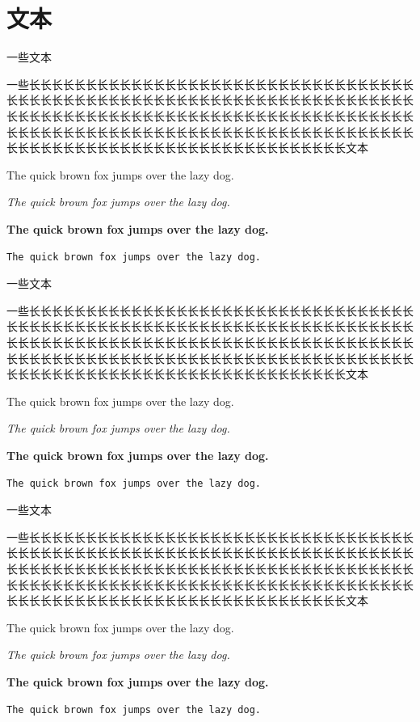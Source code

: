 \section{文本}

一些文本

一些长长长长长长长长长长长长长长长长长长长长长长长长长长长长长长长长长长长长长长长长长长长长长长长长长长长长长长长长长长长长长长长长长长长长长长长长长长长长长长长长长长长长长长长长长长长长长长长长长长长长长长长长长长长长长长长长长长长长长长长长长长长长长长长长长长长长长长长长长长长长长长长长长长长长长长长长长长长长长长长长长长长长长长长长长长长长文本

The quick brown fox jumps over the lazy dog.

\textit{The quick brown fox jumps over the lazy dog.}

\textbf{The quick brown fox jumps over the lazy dog.}

\texttt{The quick brown fox jumps over the lazy dog.}

一些文本

一些长长长长长长长长长长长长长长长长长长长长长长长长长长长长长长长长长长长长长长长长长长长长长长长长长长长长长长长长长长长长长长长长长长长长长长长长长长长长长长长长长长长长长长长长长长长长长长长长长长长长长长长长长长长长长长长长长长长长长长长长长长长长长长长长长长长长长长长长长长长长长长长长长长长长长长长长长长长长长长长长长长长长长长长长长长长长文本

The quick brown fox jumps over the lazy dog.

\textit{The quick brown fox jumps over the lazy dog.}

\textbf{The quick brown fox jumps over the lazy dog.}

\texttt{The quick brown fox jumps over the lazy dog.}

一些文本

一些长长长长长长长长长长长长长长长长长长长长长长长长长长长长长长长长长长长长长长长长长长长长长长长长长长长长长长长长长长长长长长长长长长长长长长长长长长长长长长长长长长长长长长长长长长长长长长长长长长长长长长长长长长长长长长长长长长长长长长长长长长长长长长长长长长长长长长长长长长长长长长长长长长长长长长长长长长长长长长长长长长长长长长长长长长长长文本

The quick brown fox jumps over the lazy dog.

\textit{The quick brown fox jumps over the lazy dog.}

\textbf{The quick brown fox jumps over the lazy dog.}

\texttt{The quick brown fox jumps over the lazy dog.}

